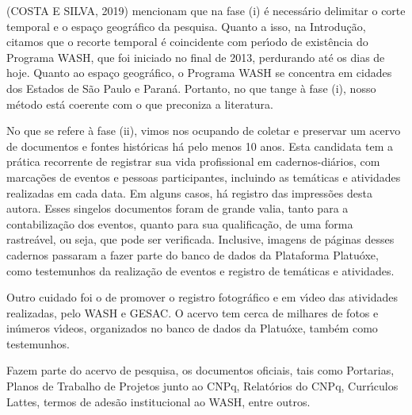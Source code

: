 \documentclass[
12pt,		%
openright,	%
twoside,  %
a4paper,			%
chapter=TITLE,		%
english,			%
french,				%
spanish,			%
brazil				%
]{USPSC-classe/USPSC}
\begin{document}
(COSTA E SILVA, 2019) mencionam que na fase (i) \'e necess\'ario delimitar o \textquotedbl corte temporal \textquotedbl  e o \textquotedbl espa\c{c}o geogr\'afico \textquotedbl  da pesquisa.  Quanto a isso, na Introdu\c{c}\~ao, citamos que o recorte temporal \'e coincidente com per\'{\i}odo de exist\^encia do Programa WASH, que foi iniciado no final de 2013, perdurando at\'e os dias de hoje. Quanto ao espa\c{c}o geogr\'afico, o Programa WASH se concentra em cidades dos Estados de S\~ao Paulo e Paran\'a. Portanto, no que tange \`a fase (i), nosso m\'etodo est\'a coerente com o que preconiza a literatura.









No que se refere \`a fase (ii), vimos nos ocupando de coletar e preservar um acervo de documentos e fontes hist\'oricas h\'a pelo menos 10 anos. Esta candidata tem a pr\'atica recorrente de registrar sua vida profissional em cadernos-di\'arios, com marca\c{c}\~oes de eventos e pessoas participantes, incluindo as tem\'aticas e atividades realizadas em cada data. Em alguns casos, h\'a registro das impress\~oes desta autora. Esses singelos documentos foram de grande valia, tanto para a contabiliza\c{c}\~ao dos eventos, quanto para sua qualifica\c{c}\~ao, de uma forma rastre\'avel, ou seja, que pode ser verificada. Inclusive, imagens de p\'aginas desses cadernos passaram a fazer parte do banco de dados da Plataforma Platu\'oxe, como testemunhos da realiza\c{c}\~ao de eventos e registro de tem\'aticas e atividades.









Outro cuidado foi o de promover o registro fotogr\'afico e em v\'{\i}deo das atividades realizadas, pelo WASH e GESAC. O acervo tem cerca de milhares de fotos e in\'umeros v\'{\i}deos, organizados no banco de dados da Platu\'oxe, tamb\'em como testemunhos.









Fazem parte do acervo de pesquisa, os documentos oficiais, tais como Portarias, Planos de Trabalho de Projetos junto ao CNPq, Relat\'orios do CNPq, Curr\'{\i}culos Lattes, termos de ades\~ao institucional ao WASH, entre outros.
\end{document}
